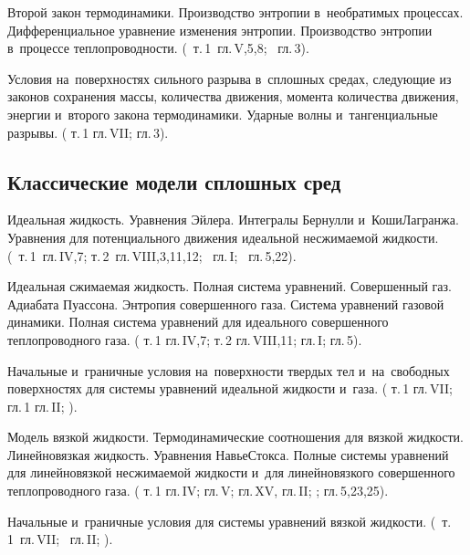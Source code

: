 \documentclass[a4paper,11pt]{article}
\def\tm#1{т.\,#1}
\def\g#1{гл.\,#1}
\def\gp#1#2{гл.\,#1\;\textsection#2}
\begin{document}
\begin{nums}{-2}
\item Второй закон термодинамики. Производство энтропии в~необратимых процессах.
Дифференциальное уравнение изменения энтропии. Производство энтропии в~процессе
теплопроводности. (\cite{1}~\tm{1}~\gp{V}{4,5,8}; \cite{2}~\gp{3}{15}).

\item Условия на~поверхностях сильного разрыва в~сплошных средах,
следующие из законов сохранения массы, количества движения, момента количества движения,
энергии и~второго закона термодинамики. Ударные волны и~тангенциальные разрывы.
(\cite{1} \tm{1} \gp{VII}{4}; \cite{2} \gp{3}{18}).

\subsection*{Классические модели сплошных сред}

\item Идеальная жидкость. Уравнения Эйлера. Интегралы Бернулли и~Коши\ч Лагранжа.
Уравнения для потенциального движения идеальной несжимаемой жидкости.\\
(\cite{1}~\tm{1}~\gp{IV}{1,7}; \tm{2}~\gp{VIII}{2,3,11,12}; \cite{3}~\g{I}; \cite{2}~\gp{5}{20,22}).

\item  Идеальная сжимаемая жидкость. Полная система уравнений. Совершенный газ.
Адиабата Пуассона. Энтропия совершенного газа. Система уравнений
газовой динамики. Полная система уравнений для идеального совершенного теплопроводного газа.
(\cite{1} \tm{1} \gp{IV}{2,7}; \tm{2} \gp{VIII}{5,11}; \cite{5} \gp{I}{7}; \cite{2} \gp{5}{25}).

\item Начальные и~граничные условия на~поверхности твердых тел и~на~свободных
поверхностях для системы уравнений идеальной жидкости и~газа.
(\cite{1} \tm{1} \gp{VII}{1}; \cite{5} \gp{1}{7} \gp{II}{2}; \cite{7}).

\item Модель вязкой жидкости. Термодинамические соотношения для вязкой жидкости.
Линейно\д вязкая жидкость. Уравнения Навье\ч Стокса. Полные системы уравнений
для линейно\д вязкой несжимаемой жидкости и~для линейно\д вязкого совершенного
теплопроводного газа.
(\cite{1} \tm{1} \gp{IV}{2}; \gp{V}{7}; \cite{4} \gp{XV}{141},
\cite{6} \gp{II}{2}; \cite{7}; \cite{2} \gp{5}{20,23,25}).

\item Начальные и~граничные условия для системы уравнений вязкой жидкости.
(\cite{1}~\tm{1}~\gp{VII}{1}; \cite{6}~\gp{II}{2}; \cite{7}).


\end{nums}
\end{document}
